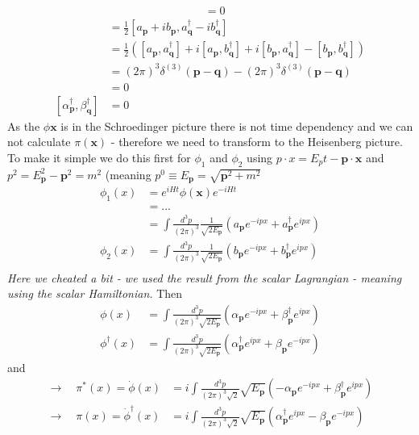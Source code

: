 \documentclass[10pt,a4paper]{book}
\theoremstyle{definition}
\begin{document}
\begin{enumerate}[(a)]
\begin{align}
&=0
\end{align}
\begin{align}
[\alpha_\mathbf{p},\beta^\dagger_\mathbf{q}]
&=\frac{1}{2}[a_\mathbf{p}+ib_\mathbf{p},a^\dagger_\mathbf{q}-ib^\dagger_\mathbf{q}]\\
&=\frac{1}{2}([a_\mathbf{p},a^\dagger_\mathbf{q}]+i[a_\mathbf{p},b^\dagger_\mathbf{q}]+i[b_\mathbf{p},a^\dagger_\mathbf{q}]-[b_\mathbf{p},b^\dagger_\mathbf{q}])\\
&=(2\pi)^3\delta^{(3)}(\mathbf{p}-\mathbf{q})-(2\pi)^3\delta^{(3)}(\mathbf{p}-\mathbf{q})\\
&=0\\
[\alpha^\dagger_\mathbf{p},\beta^\dagger_\mathbf{q}]&=0
\end{align}
As the $\phi{\mathbf{x}}$ is in the Schroedinger picture there is not time dependency and we can not calculate $\pi(\mathbf{x})$ - therefore we need to transform to the Heisenberg picture. To make it simple we do this first for $\phi_1$ and $\phi_2$ using $p\cdot x=E_pt-\mathbf{p}\cdot\mathbf{x}$ and $p^2=E_\mathbf{p}^2-\mathbf{p}^2=m^2$ (meaning $p^0\equiv E_\mathbf{p}=\sqrt{\mathbf{p}^2+m^2}$
\begin{align}
\phi_1(x)
&=e^{iHt}\phi(\mathbf{x})e^{-iHt}\\
&=...\\
&=\int\frac{d^3p}{(2\pi)^3}\frac{1}{\sqrt{2E_\mathbf{p}}}(a_\mathbf{p}e^{-ipx}+a^\dagger_\mathbf{p}e^{ipx})\\
\phi_2(x)
&=\int\frac{d^3p}{(2\pi)^3}\frac{1}{\sqrt{2E_\mathbf{p}}}(b_\mathbf{p}e^{-ipx}+b^\dagger_\mathbf{p}e^{ipx})\\
\end{align}
{\it Here we cheated a bit - we used the result from the scalar Lagrangian - meaning using the scalar Hamiltonian.}
Then
\begin{align}
\phi(x)
&=\int\frac{d^3p}{(2\pi)^3\sqrt{2E_\mathbf{p}}}\left(\alpha_\mathbf{p}e^{-ipx}+\beta^\dagger_\mathbf{p} e^{ipx}\right)\\
\phi^\dagger(x)
&=\int\frac{d^3p}{(2\pi)^3\sqrt{2E_\mathbf{p}}}\left(\alpha^\dagger_\mathbf{p}e^{ipx}+\beta_\mathbf{p}e^{-ipx}\right)
\end{align}
and
\begin{align}
\rightarrow\quad\pi^*(x)=\dot{\phi}(x)
&=i\int\frac{d^3p}{(2\pi)^3\sqrt{2}}\sqrt{E_\mathbf{p}}\left(-\alpha_\mathbf{p}e^{-ipx}+\beta^\dagger_\mathbf{p} e^{ipx}\right)\\
\rightarrow\quad\pi(x)=\dot{\phi}^\dagger(x)
&=i\int\frac{d^3p}{(2\pi)^3\sqrt{2}}\sqrt{E_\mathbf{p}}\left(\alpha^\dagger_\mathbf{p}e^{ipx}-\beta_\mathbf{p} e^{-ipx}\right)

\end{align}
\end{enumerate}
\end{document}
